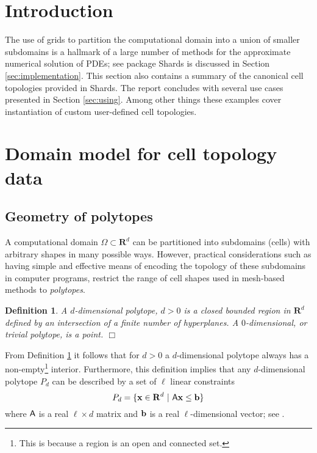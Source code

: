 \documentclass[pdf,12pt,relaxed]{SANDreport}
\newtheorem{defin}{Definition}
\begin{document}
    \section{Introduction}\label{sec:intro}

The use of grids to partition the computational domain into a union of smaller subdomains is a hallmark of a large number of methods for the approximate numerical solution of PDEs; see \cite{trilinos} package Shards is discussed in Section \ref{sec:implementation}. This section also contains a summary of the canonical cell topologies provided in Shards. The report concludes with several use cases presented in Section \ref{sec:using}. Among other things these examples cover instantiation of custom user-defined cell topologies.


    \section{Domain model for cell topology data}\label{sec:model}
    
    \subsection{Geometry of polytopes}
    A computational domain $\Omega\subset \mathbf{R}^d$ can be partitioned into subdomains (cells) with arbitrary shapes in many possible ways. However, practical considerations such as having simple and effective means of encoding the topology of these subdomains in  computer programs, restrict the range of cell shapes used in mesh-based methods  to \emph{polytopes}. 
 
 
     \begin{defin}\label{def:polytope}
     A $d$-dimensional polytope, $d>0$ is a closed bounded region in $\mathbf{R}^d$ defined by an intersection of a finite number of hyperplanes. A $0$-dimensional, or trivial polytope, is a point. \hfill$\Box$
     \end{defin}
                   
      From Definition \ref{def:polytope} it follows that for $d>0$ a $d$-dimensional polytope always has a non-empty\footnote{This is because a region is an open and connected set.} interior. Furthermore, this definition implies that any $d$-dimensional polytope $P_d$ can be described by a set of $\ell$ linear constraints
    \begin{equation}\label{eq:polytope}
    P_d = \{ {\bf x}\in {\mathbf{R}}^d\,\,|\,\, {\sf A}{\bf x} \le {\bf b} \}
    \end{equation}
    where ${\sf A}$ is a real $\ell \times d$ matrix and $\bf{b}$ is a real $\ell$-dimensional vector; see \cite{math:polytope}. 
    
\end{document}
